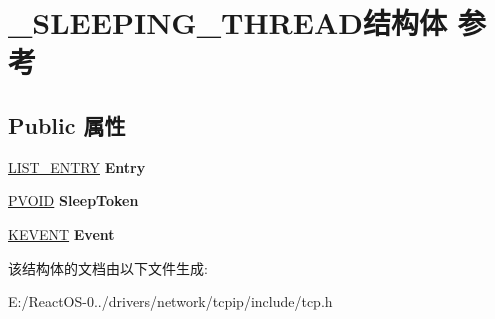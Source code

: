 \hypertarget{struct___s_l_e_e_p_i_n_g___t_h_r_e_a_d}{}\section{\+\_\+\+S\+L\+E\+E\+P\+I\+N\+G\+\_\+\+T\+H\+R\+E\+A\+D结构体 参考}
\label{struct___s_l_e_e_p_i_n_g___t_h_r_e_a_d}
\subsection*{Public 属性}
\begin{DoxyCompactItemize}
\item 
\mbox{\label{struct___s_l_e_e_p_i_n_g___t_h_r_e_a_d_a3bb6eda8a0846e95759abd989adad909}} 
\hyperlink{struct___l_i_s_t___e_n_t_r_y}{L\+I\+S\+T\+\_\+\+E\+N\+T\+RY} {\bfseries Entry}
\item 
\mbox{\label{struct___s_l_e_e_p_i_n_g___t_h_r_e_a_d_a175352da01cc9b8bd8b08a09dce0aa6b}} 
\hyperlink{interfacevoid}{P\+V\+O\+ID} {\bfseries Sleep\+Token}
\item 
\mbox{\label{struct___s_l_e_e_p_i_n_g___t_h_r_e_a_d_a4c4cf721496fdc924a127d69f021292d}} 
\hyperlink{struct___k_e_v_e_n_t}{K\+E\+V\+E\+NT} {\bfseries Event}
\end{DoxyCompactItemize}


该结构体的文档由以下文件生成\+:\begin{DoxyCompactItemize}
\item 
E\+:/\+React\+O\+S-\/0../drivers/network/tcpip/include/tcp.\+h\end{DoxyCompactItemize}
